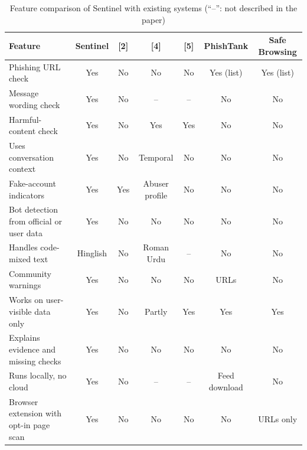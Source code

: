 \begin{table}[H]
\centering
\footnotesize
\renewcommand{\arraystretch}{1.2}
\caption{Feature comparison of Sentinel with existing systems (``--'': not described in the paper)}
\label{tab:features}
\begin{tabular}{|>{\raggedright\arraybackslash}p{3.6cm}|c|c|c|c|c|c|}
\hline
\textbf{Feature} & \textbf{Sentinel} & \textbf{[2]} & \textbf{[4]} & \textbf{[5]} & \textbf{PhishTank} & \textbf{Safe Browsing} \\ \hline
Phishing URL check & Yes & No & No & No & Yes (list) & Yes (list) \\ \hline
Message wording check & Yes & No & -- & -- & No & No \\ \hline
Harmful-content check & Yes & No & Yes & Yes & No & No \\ \hline
Uses conversation context & Yes & No & Temporal & No & No & No \\ \hline
Fake-account indicators & Yes & Yes & Abuser profile & No & No & No \\ \hline
Bot detection from official or user data & Yes & No & No & No & No & No \\ \hline
Handles code-mixed text & Hinglish & No & Roman Urdu & -- & No & No \\ \hline
Community warnings & Yes & No & No & No & URLs & No \\ \hline
Works on user-visible data only & Yes & No & Partly & Yes & Yes & Yes \\ \hline
Explains evidence and missing checks & Yes & No & No & No & No & No \\ \hline
Runs locally, no cloud & Yes & No & -- & -- & Feed download & No \\ \hline
Browser extension with opt-in page scan & Yes & No & No & No & No & URLs only \\ \hline
\end{tabular}
\end{table}
